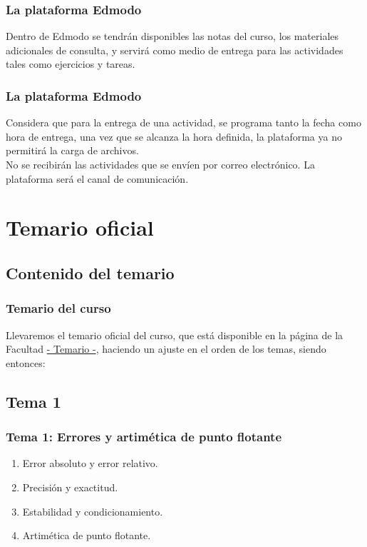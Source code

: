 \documentclass[12pt]{beamer}
\begin{document}
\begin{frame}
\frametitle{La plataforma Edmodo}
Dentro de Edmodo se tendrán disponibles las notas del curso, los materiales adicionales de consulta, y servirá como medio de entrega para las actividades tales como ejercicios y tareas.
\end{frame}
\begin{frame}
\frametitle{La plataforma Edmodo}
Considera que para la entrega de una actividad, se programa tanto la fecha como hora de entrega, una vez que se alcanza la hora definida, la plataforma ya no permitirá la carga de archivos.
\\
\bigskip
\pause
No se recibirán las actividades que se envíen por correo electrónico. La plataforma será el canal de comunicación.
\end{frame}
\section{Temario oficial}
\subsection{Contenido del temario}
\begin{frame}
\frametitle{Temario del curso}
Llevaremos el temario oficial del curso, que está disponible en la página de la Facultad \href{http://www.fciencias.unam.mx/asignaturas/715.pdf}{- Temario -}, haciendo un ajuste en el orden de los temas, siendo entonces:
\end{frame}
\subsection*{Tema 1}
\begin{frame}
\frametitle{\textbf{Tema 1: Errores y artimética de punto flotante}}
\begin{enumerate}[<+->]
\item Error absoluto y error relativo.
\item Precisión y exactitud.
\item Estabilidad y condicionamiento.
\item Artimética de punto flotante.
\end{enumerate}
\end{frame}
\end{document}
